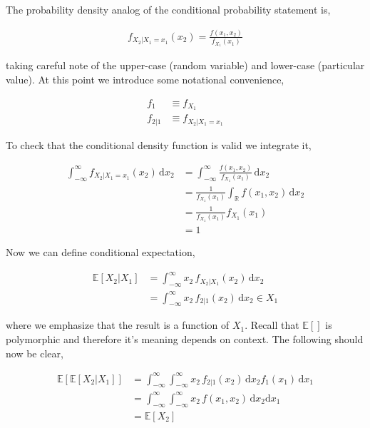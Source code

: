 The probability density analog of the conditional probability statement is,

\begin{align*}
f_{X_2 | X_1 = x_1}(x_2) = \frac{f(x_1, x_2)}{f_{X_1}(x_1)}
\end{align*}

taking careful note of the upper-case (random variable) and lower-case (particular value). At this point we introduce some notational convenience,

\begin{align*}
f_1 &\equiv f_{X_1}\\
f_{2|1} &\equiv f_{X_2 | X_1 = x_1}
\end{align*}

To check that the conditional density function is valid we integrate it,

\begin{align*}
\int_{-\infty}^\infty f_{X_2 | X_1 = x_1}(x_2) \,\mathrm{d}x_2
&= \int_{-\infty}^\infty \frac{f(x_1, x_2)}{f_{X_1}(x_1)} \,\mathrm{d}x_2\\
&= \frac{1}{f_{X_1}(x_1)}\int_\mathbb{R} f(x_1, x_2) \,\mathrm{d}x_2\\
&= \frac{1}{f_{X_1}(x_1)}f_{X_1}(x_1)\\
&= 1
\end{align*}

Now we can define conditional expectation,

\begin{align*}
\mathbb{E} \left[X_2 | X_1 \right] 
&= \int_{-\infty}^\infty x_2 \, f_{X_2 | X_1}(x_2) \,\mathrm{d}x_2\\
&= \int_{-\infty}^\infty x_2 \, f_{2|1}(x_2) \,\mathrm{d}x_2 \in X_1
\end{align*}

where we emphasize that the result is a function of $X_1$. Recall that $\mathbb{E}[]$ is polymorphic and therefore it's meaning depends on context. The following should now be clear,

\begin{align}
\mathbb{E}\left[\mathbb{E}\left[X_2 | X_1 \right] \right]
&= \int_{-\infty}^\infty\int_{-\infty}^\infty x_2 \, f_{2|1}(x_2)\,\mathrm{d}x_2 f_1(x_1) \,\mathrm{d}x_1\\
&= \int_{-\infty}^\infty\int_{-\infty}^\infty x_2 \, f(x_1, x_2)\,\mathrm{d}x_2\mathrm{d}x_1\\
\label{eq:exp_exp} &= \mathbb{E}\left[X_2\right]
\end{align}

